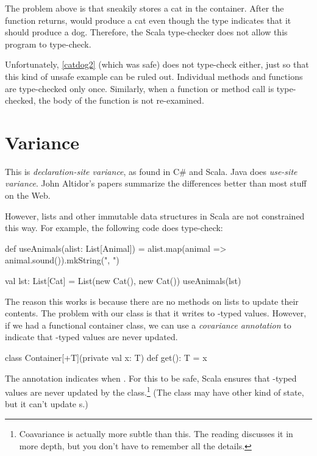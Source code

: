 \documentclass{book}
\begin{document}
The problem above is that  sneakily stores a cat in
the container. After the function returns,  would produce
a cat even though the type indicates that it should produce a dog.
Therefore, the Scala type-checker does not allow this program to type-check.

Unfortunately, \cref{catdog2} (which was safe) does not type-check either, just so that
this kind of unsafe example can be ruled out. Individual methods and functions
are type-checked only once. Similarly, when a function or method call is type-checked,
the body of the function is not re-examined.

\section{Variance}

\begin{instructor}
This is \emph{declaration-site variance}, as found in C\# and Scala. Java
does \emph{use-site variance}. John Altidor's papers summarize the differences
better than most stuff on the Web.
\end{instructor}

However, lists and other immutable data structures in Scala are not constrained
this way. For example, the following code does type-check:

\begin{scalacode}
def useAnimals(alist: List[Animal]) = {
  alist.map(animal => animal.sound()).mkString(", ")
}

val lst: List[Cat] = List(new Cat(), new Cat())
useAnimals(lst)
\end{scalacode}

The reason this works is because there are no methods on lists to update
their contents. The problem with our  class is
that it writes to -typed values. However, if we had a functional
container class, we can use a \emph{covariance annotation} to indicate
that -typed values are never updated.

\begin{scalacode}
class Container[+T](private val x: T) {
  def get(): T = x
}
\end{scalacode}

The  annotation indicates  when . For this to be safe,
Scala ensures that -typed values are never updated
by the class.\footnote{Coavariance is actually more subtle than this. The reading discusses it in more depth, but you don't have to remember all the details.} (The class may have other kind of state, but it can't
update s.)
\end{document}
